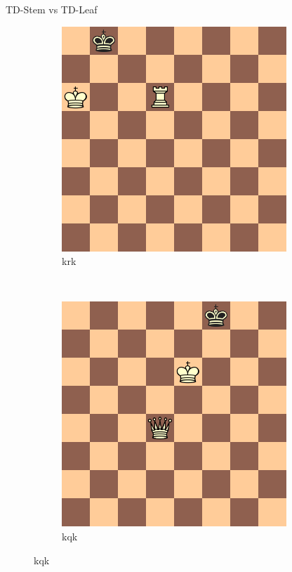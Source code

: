 \documentclass{beamer}
\begin{document}
\begin{frame}{TD-Stem vs TD-Leaf}
	\centering
	\begin{figure}
		\centering
		\begin{subfigure}{0.4\textwidth}
			\includegraphics[scale=0.35]{fig/search/3}
			\caption{krk}
		\end{subfigure}
		~
		\begin{subfigure}{0.4\textwidth}
			\includegraphics[scale=0.35]{abstracts/diagram}
			\caption{kqk}
		\end{subfigure}
	\end{figure}
\end{frame}
\end{document}
